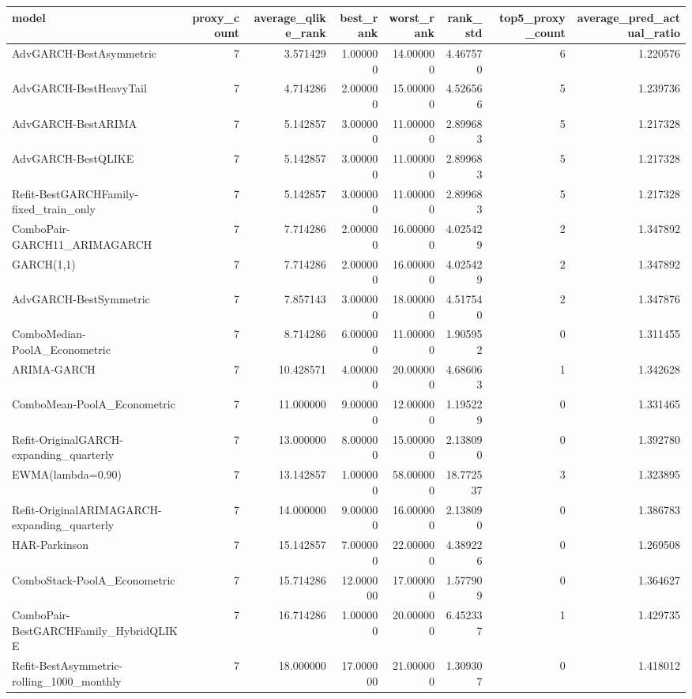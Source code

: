 \begin{tabular}{l r r r r r r r}
\hline
model & proxy\_count & average\_qlike\_rank & best\_rank & worst\_rank & rank\_std & top5\_proxy\_count & average\_pred\_actual\_ratio \\
\hline
AdvGARCH-BestAsymmetric & 7 & 3.571429 & 1.000000 & 14.000000 & 4.467570 & 6 & 1.220576 \\
AdvGARCH-BestHeavyTail & 7 & 4.714286 & 2.000000 & 15.000000 & 4.526566 & 5 & 1.239736 \\
AdvGARCH-BestARIMA & 7 & 5.142857 & 3.000000 & 11.000000 & 2.899683 & 5 & 1.217328 \\
AdvGARCH-BestQLIKE & 7 & 5.142857 & 3.000000 & 11.000000 & 2.899683 & 5 & 1.217328 \\
Refit-BestGARCHFamily-fixed\_train\_only & 7 & 5.142857 & 3.000000 & 11.000000 & 2.899683 & 5 & 1.217328 \\
ComboPair-GARCH11\_ARIMAGARCH & 7 & 7.714286 & 2.000000 & 16.000000 & 4.025429 & 2 & 1.347892 \\
GARCH(1,1) & 7 & 7.714286 & 2.000000 & 16.000000 & 4.025429 & 2 & 1.347892 \\
AdvGARCH-BestSymmetric & 7 & 7.857143 & 3.000000 & 18.000000 & 4.517540 & 2 & 1.347876 \\
ComboMedian-PoolA\_Econometric & 7 & 8.714286 & 6.000000 & 11.000000 & 1.905952 & 0 & 1.311455 \\
ARIMA-GARCH & 7 & 10.428571 & 4.000000 & 20.000000 & 4.686063 & 1 & 1.342628 \\
ComboMean-PoolA\_Econometric & 7 & 11.000000 & 9.000000 & 12.000000 & 1.195229 & 0 & 1.331465 \\
Refit-OriginalGARCH-expanding\_quarterly & 7 & 13.000000 & 8.000000 & 15.000000 & 2.138090 & 0 & 1.392780 \\
EWMA(lambda=0.90) & 7 & 13.142857 & 1.000000 & 58.000000 & 18.772537 & 3 & 1.323895 \\
Refit-OriginalARIMAGARCH-expanding\_quarterly & 7 & 14.000000 & 9.000000 & 16.000000 & 2.138090 & 0 & 1.386783 \\
HAR-Parkinson & 7 & 15.142857 & 7.000000 & 22.000000 & 4.389226 & 0 & 1.269508 \\
ComboStack-PoolA\_Econometric & 7 & 15.714286 & 12.000000 & 17.000000 & 1.577909 & 0 & 1.364627 \\
ComboPair-BestGARCHFamily\_HybridQLIKE & 7 & 16.714286 & 1.000000 & 20.000000 & 6.452337 & 1 & 1.429735 \\
Refit-BestAsymmetric-rolling\_1000\_monthly & 7 & 18.000000 & 17.000000 & 21.000000 & 1.309307 & 0 & 1.418012 \\

\end{tabular}
